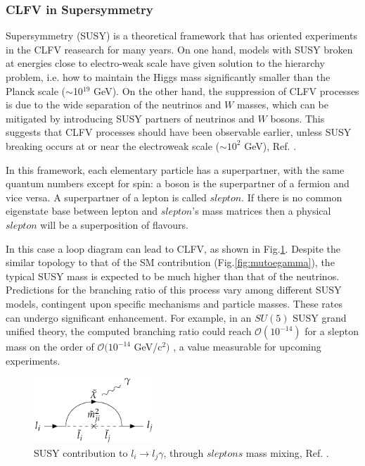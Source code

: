 \subsubsection{CLFV in Supersymmetry}\label{susy}
Supersymmetry (SUSY) is a theoretical framework that has oriented experiments in the CLFV reasearch for many years. On one hand, models with SUSY broken at energies close to electro-weak scale have given solution to the hierarchy problem, i.e. how to maintain the Higgs mass significantly smaller than the Planck scale ($\sim$10$^{19}$ GeV). On the other hand, the suppression of CLFV processes is due to the wide separation of the neutrinos and $W$ masses, which can be mitigated by introducing SUSY partners of neutrinos and $W$ bosons. This suggests that CLFV processes should have been observable earlier, unless SUSY breaking occurs at or near the electroweak scale ($\sim 10^2$ GeV), Ref. \cite{clfv_signorelli}.

{\violet In this framework, each elementary particle has a superpartner,  with the same quantum numbers except for spin: a boson is the superpartner of a fermion and vice versa. A superpartner of a lepton is called $slepton$. If there is no common eigenstate base between lepton and $slepton$'s mass matrices then a physical $slepton$ will be a superposition of flavours.}


In this case a loop diagram can lead to CLFV, as shown in Fig.\ref{fig:susy}. Despite the similar topology to that of the SM contribution (Fig.\ref{fig:mutoegamma}), the typical SUSY mass is expected to be much higher than that of the neutrinos. Predictions for the branching ratio of this process vary among different SUSY models, contingent upon specific mechanisms and particle masses. These rates can undergo significant enhancement. For example, in an $SU(5)$ SUSY grand unified theory, the computed branching ratio could reach $\mathcal{O}(10^{-14})$ for a {\violet slepton mass on the order of $\mathcal{O}(10^{-14}$ GeV/c$^2)$} , a value measurable for upcoming experiments.


\begin{figure}[!h]
\centering
\includegraphics[width =0.4\textwidth]{figures/png/Screenshot_20240218_105920.png}
\caption[SUSY contribution to $l_i \rightarrow l_j\gamma$.]{SUSY contribution to $l_i \rightarrow l_j\gamma$, through $sleptons$ mass mixing, Ref. \cite{universe8060299}.}
\label{fig:susy}
\end{figure}


